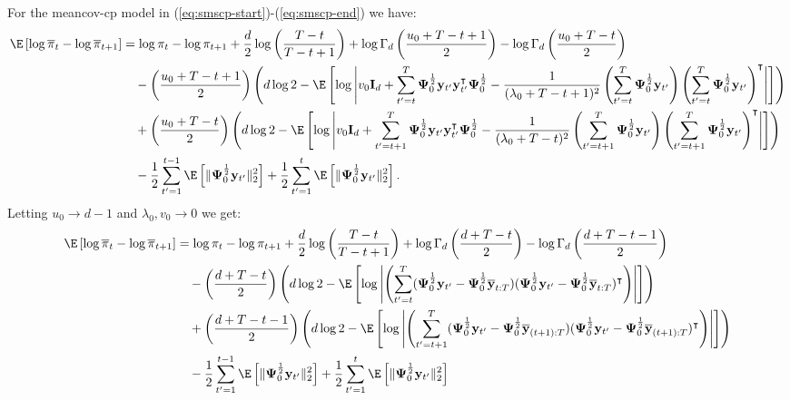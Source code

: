 For the meancov-cp model in (\ref{eq:smscp-start})-(\ref{eq:smscp-end}) we have:
\scriptsize
\begin{align*}
    \E\left[\log\overline{\pi}_t - \log \overline{\pi}_{t+1} \right] &= \log \pi_t- \log \pi_{t+1} + \frac{d}{2}\log\left(\frac{T-t}{T-t+1}\right) +\log \Gamma_d\left(\frac{u_0 + T-t+1}{2}\right) - \log \Gamma_d\left(\frac{u_0 + T-t}{2}\right) \\
    &\quad - \left(\frac{u_0 + T - t+1}{2}\right)\left(d\log 2 - \E\left[\log \left|v_0\mathbf{I}_d +  \sum_{t'=t}^{T} \boldsymbol{\Psi}^{\frac{1}{2}}_{0}\mathbf{y}_{t'}\mathbf{y}^\intercal_{t'}\boldsymbol{\Psi}^{\frac{1}{2}}_{0}- \frac{1}{(\lambda_0 +T -t+1)^2} \left(\sum_{t'=t}^T \boldsymbol{\Psi}^{\frac{1}{2}}_{0}\mathbf{y}_{t'}\right)\left(\sum_{t'=t}^T \boldsymbol{\Psi}^{\frac{1}{2}}_{0}\mathbf{y}_{t'}\right)^{\intercal}\right| \right]\right) \\
    &\quad + \left(\frac{u_0 + T - t}{2}\right)\left(d\log 2 - \E\left[\log \left|v_0\mathbf{I}_d +  \sum_{t'=t+1}^{T} \boldsymbol{\Psi}^{\frac{1}{2}}_{0}\mathbf{y}_{t'}\mathbf{y}^\intercal_{t'}\boldsymbol{\Psi}^{\frac{1}{2}}_{0} - \frac{1}{(\lambda_0 +T -t)^2} \left(\sum_{t'=t+1}^T \boldsymbol{\Psi}^{\frac{1}{2}}_{0}\mathbf{y}_{t'}\right)\left(\sum_{t'=t+1}^T \boldsymbol{\Psi}^{\frac{1}{2}}_{0}\mathbf{y}_{t'}\right)^{\intercal} \right| \right]\right) \\
    &\quad- \frac{1}{2}\sum_{t'=1}^{t-1} \E\left[\lVert\boldsymbol{\Psi}_{0}^{\frac{1}{2}}\mathbf{y}_{t'}\rVert_2^2 \right] + \frac{1}{2}\sum_{t'=1}^{t} \E\left[\lVert\boldsymbol{\Psi}_{0}^{\frac{1}{2}}\mathbf{y}_{t'}\rVert_2^2 \right].
\end{align*}
\normalsize
Letting $u_0\to d-1$ and $\lambda_0,v_0 \to 0$ we get:
\small
\begin{align*}
    \E\left[\log\overline{\pi}_t - \log \overline{\pi}_{t+1} \right] &= \log \pi_t- \log \pi_{t+1} + \frac{d}{2}\log\left(\frac{T-t}{T-t+1}\right) +\log \Gamma_d\left(\frac{d + T-t}{2}\right) - \log \Gamma_d\left(\frac{d + T-t - 1}{2}\right) \\
    &\quad - \left(\frac{d + T - t}{2}\right)\left(d\log 2 - \E\left[\log \left|\left(\sum_{t'=t}^{T} (\boldsymbol{\Psi}^{\frac{1}{2}}_{0}\mathbf{y}_{t'} - \boldsymbol{\Psi}^{\frac{1}{2}}_{0}\overline{\mathbf{y}}_{t:T})(\boldsymbol{\Psi}^{\frac{1}{2}}_{0}\mathbf{y}_{t'} - \boldsymbol{\Psi}^{\frac{1}{2}}_{0}\overline{\mathbf{y}}_{t:T})^\intercal\right)\right| \right]\right) \\
    &\quad + \left(\frac{d + T - t-1}{2}\right)\left(d\log 2 - \E\left[\log \left|\left(\sum_{t'=t+1}^{T} (\boldsymbol{\Psi}^{\frac{1}{2}}_{0}\mathbf{y}_{t'} - \boldsymbol{\Psi}^{\frac{1}{2}}_{0}\overline{\mathbf{y}}_{(t+1):T})(\boldsymbol{\Psi}^{\frac{1}{2}}_{0}\mathbf{y}_{t'} - \boldsymbol{\Psi}^{\frac{1}{2}}_{0}\overline{\mathbf{y}}_{(t+1):T})^\intercal\right)\right| \right]\right) \\
    &\quad- \frac{1}{2}\sum_{t'=1}^{t-1} \E\left[\lVert\boldsymbol{\Psi}_{0}^{\frac{1}{2}}\mathbf{y}_{t'}\rVert_2^2 \right] + \frac{1}{2}\sum_{t'=1}^{t} \E\left[\lVert\boldsymbol{\Psi}_{0}^{\frac{1}{2}}\mathbf{y}_{t'}\rVert_2^2 \right]
\end{align*}
